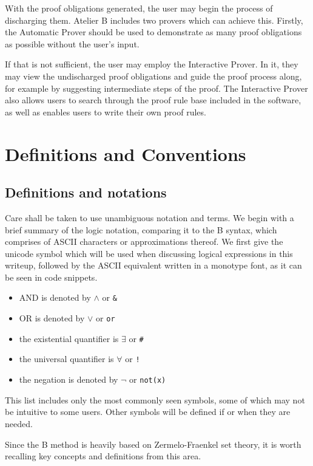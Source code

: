 \documentclass[11pt,journal]{IEEEtran}
\begin{document}
	With the proof obligations generated, the user may begin the process of discharging them. Atelier B includes two provers which can achieve this. Firstly, the Automatic Prover should be used to demonstrate as many proof obligations as possible without the user's input.
	
	If that is not sufficient, the user may employ the Interactive Prover. In it, they may view the undischarged proof obligations and guide the proof process along, for example by suggesting intermediate steps of the proof. The Interactive Prover also allows users to search through the proof rule base included in the software, as well as enables users to write their own proof rules.
	
	
	
	\section{Definitions and Conventions}
	
	\subsection{Definitions and notations}
	Care shall be taken to use unambiguous notation and terms. We begin with a brief summary of the logic notation, comparing it to the B syntax, which comprises of ASCII characters or approximations thereof. We first give the unicode symbol which will be used when discussing logical expressions in this writeup, followed by the ASCII equivalent written in a monotype font, as it can be seen in code snippets. 
	\begin{itemize}
		\item AND is denoted by $\wedge$ or \texttt{\&}
		\item OR is denoted by $\vee$ or \texttt{or}
		\item the existential quantifier is $\exists$ or \texttt{\#}
		\item the universal quantifier is $\forall$ or \texttt{!}
		\item the negation is denoted by $\neg$ or \texttt{not(x)}
	\end{itemize}
	This list includes only the most commonly seen symbols, some of which may not be intuitive to some users. Other symbols will be defined if or when they are needed.
	
	Since the B method is heavily based on Zermelo-Fraenkel set theory, it is worth recalling key concepts and definitions from this area.\cite{Goldrei}
	
\end{document}
